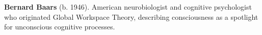 \textbf{Bernard Baars} (b. 1946). American neurobiologist and cognitive psychologist who originated Global Workspace Theory, describing consciousness as a spotlight for unconscious cognitive processes.

